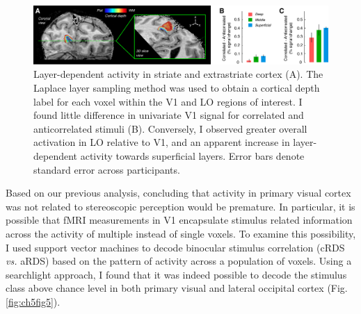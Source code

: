 \begin{figure}
  \centering
  \includegraphics[keepaspectratio,width=14cm]{Fig4.pdf}
  \caption[Layer-dependent activity in striate and extrastriate cortex.]{Layer-dependent activity in striate and extrastriate cortex (A). The Laplace layer sampling method \cite{Jones:2000cr} was used to obtain a cortical depth label for each voxel within the V1 and LO regions of interest. I found little difference in univariate V1 signal for correlated and anticorrelated stimuli (B). Conversely, I observed greater overall activation in LO relative to V1, and an apparent increase in layer-dependent activity towards superficial layers. Error bars denote standard error across participants.}
  \label{fig:ch5fig4}
\end{figure}

Based on our previous analysis, concluding that activity in primary visual cortex was not related to stereoscopic perception would be premature. In particular, it is possible that fMRI measurements in V1 encapsulate stimulus related information across the activity of multiple instead of single voxels. To examine this possibility, I used support vector machines to decode binocular stimulus correlation (cRDS \textit{vs.} aRDS) based on the pattern of activity across a population of voxels. Using a searchlight approach, I found that it was indeed possible to decode the stimulus class above chance level in both primary visual and lateral occipital cortex (Fig. \ref{fig:ch5fig5}).

